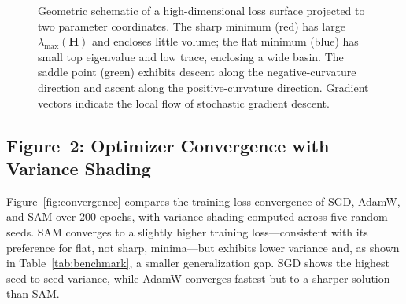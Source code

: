 \documentclass[twocolumn,10pt]{article}
\newcommand{\Hmat}{\mathbf{H}}
\begin{document}
\begin{figure}[t]
\caption{Geometric schematic of a high-dimensional loss surface projected to two parameter coordinates. The sharp minimum (red) has large $\lambda_{\max}(\Hmat)$ and encloses little volume; the flat minimum (blue) has small top eigenvalue and low trace, enclosing a wide basin. The saddle point (green) exhibits descent along the negative-curvature direction and ascent along the positive-curvature direction. Gradient vectors indicate the local flow of stochastic gradient descent.}
\label{fig:schematic}
\end{figure}

\subsection{Figure~2: Optimizer Convergence with Variance Shading}

Figure~\ref{fig:convergence} compares the training-loss convergence of SGD, AdamW, and SAM over $200$ epochs, with variance shading computed across five random seeds. SAM converges to a slightly higher training loss---consistent with its preference for flat, not sharp, minima---but exhibits lower variance and, as shown in Table~\ref{tab:benchmark}, a smaller generalization gap. SGD shows the highest seed-to-seed variance, while AdamW converges fastest but to a sharper solution than SAM.
\end{document}
